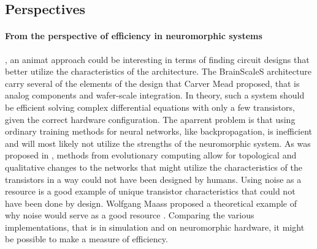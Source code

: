 \subsection{Perspectives}
\paragraph{From the perspective of efficiency in neuromorphic systems}, an animat approach could be interesting in terms of finding circuit designs that better utilize the characteristics of the architecture.
The BrainScaleS architecture carry several of the elements of the design that Carver Mead proposed, that is analog components and wafer-scale integration.
In theory, such a system should be efficient solving complex differential equations with only a few transistors, given the correct hardware configuration.
The aparrent problem is that using ordinary training methods for neural networks, like backpropagation, is inefficient and will most likely not utilize the strengths of the neuromorphic system.
As was proposed in \cite{schuman_evolutionary_2016}, methods from evolutionary computing allow for topological and qualitative changes to the networks that might utilize the characteristics of the transistors in a way could not have been designed by humans.
Using noise as a resource is a good example of unique transistor characteristics that could not have been done by design.
Wolfgang Maass proposed a theoretical example of why noise would serve as a good resource \cite{maass_noise_2014}.
Comparing the various implementations, that is in simulation and on neuromorphic hardware, it might be possible to make a measure of efficiency.

